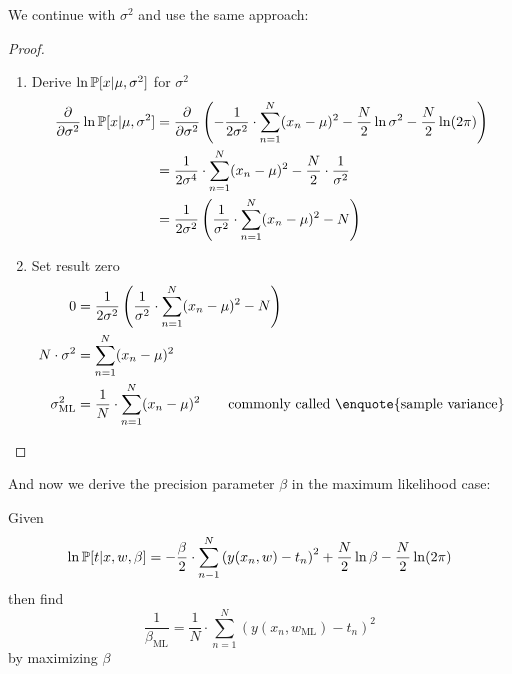 We continue with $\sigma^2$ and use the same approach:

\begin{proof}
  \begin{enumerate}
  \item Derive $\ln{\mathbb P[x | \mu, \sigma^2]}$ for $\sigma^2$
    \begin{align*}
      \frac{\partial}{\partial \sigma^2} \ln{\mathbb P[x | \mu, \sigma^2]}
      &= \frac{\partial}{\partial \sigma^2} \left(-\frac{1}{2\sigma^2} \cdot \sum_{n=1}^N (x_n - \mu)^2 - \frac{N}2 \ln{\sigma^2} - \frac{N}2 \ln(2\pi)\right) \\
      &= \frac{1}{2\sigma^4} \cdot \sum_{n=1}^N (x_n - \mu)^2 - \frac{N}{2} \cdot \frac{1}{\sigma^2} \\
      &= \frac{1}{2\sigma^2} \left(\frac{1}{\sigma^2} \cdot \sum_{n=1}^N (x_n - \mu)^2 - N\right)
    \end{align*}
  \item Set result zero
    \begin{align*}
      0 &= \frac{1}{2\sigma^2} \left(\frac{1}{\sigma^2} \cdot \sum_{n=1}^N (x_n - \mu)^2 - N\right) \\
      N \cdot \sigma^2 &= \sum_{n=1}^N (x_n - \mu)^2 \\
      \sigma^2_{\text{ML}} &= \frac{1}{N} \cdot \sum_{n=1}^N (x_n - \mu)^2 \qquad \text{commonly called \enquote{sample variance}}
    \end{align*}
  \end{enumerate}
\end{proof}

And now we derive the precision parameter $\beta$ in the maximum likelihood case:

\begin{theorem}
  Given
  \[ \ln{\mathbb P[t | x, w, \beta]} = -\frac{\beta}{2} \cdot \sum_{n-1}^N \left(y(x_n,w) - t_n\right)^2 + \frac{N}2 \ln{\beta} - \frac{N}{2} \ln(2\pi) \]
  then find
  \[ \frac{1}{\beta_{\text{ML}}} = \frac{1}{N} \cdot \sum_{n=1}^N (y(x_n, w_{\text{ML}}) - t_n)^2 \] by maximizing $\beta$
\end{theorem}

